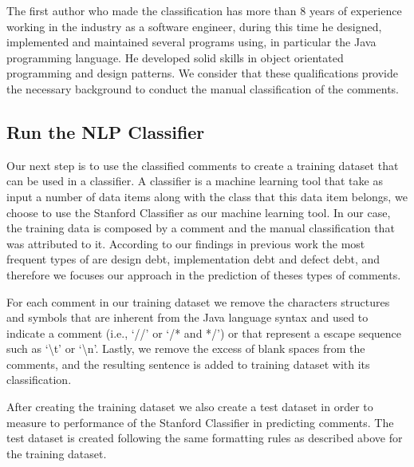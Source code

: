 The first author who made the classification has more than 8 years of experience working in the industry as a software engineer, during this time he designed, implemented and maintained several programs using, in particular the Java programming language. He developed solid skills in object orientated programming and design patterns. We consider that these qualifications provide the necessary background to conduct the manual classification of the comments.   


\subsection{Run the NLP Classifier} %
\label{sub:run_the_nlp_classifier}
 
Our next step is to use the classified \SATD comments to create a training dataset that can be used in a classifier. A classifier is a machine learning tool that take as input a number of data items along with the class that this data item belongs, we choose to use the Stanford Classifier  as our machine learning tool. In our case, the training data is composed by a comment and the manual classification that was attributed to it. According to our findings in previous work \cite{Maldonado2015MTD} the most frequent types of \SATD are design debt, implementation debt and defect debt, and therefore we focuses our approach in the prediction of theses types of \SATD comments.

For each comment in our training dataset we remove the characters structures and symbols that are inherent from the Java language syntax and used to indicate a comment (i.e., `//' or `/* and */') or that represent a escape sequence such as `\textbackslash t' or `\textbackslash n'. Lastly, we remove the excess of blank spaces from the comments, and the resulting sentence is added to training dataset with its classification. 

After creating the training dataset we also create a test dataset in order to measure to performance of the Stanford Classifier in predicting \SATD comments. The test dataset is created following the same formatting rules as described above for the training dataset. 

